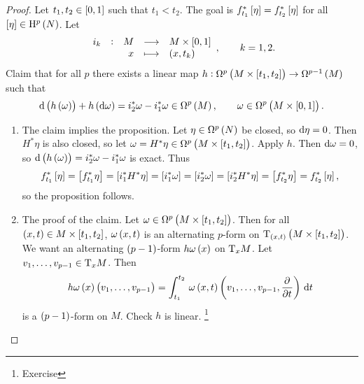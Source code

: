 \begin{proof}
Let $ t_1, t_2 \in \sbr{0, 1} $ such that $ t_1 < t_2 $. The goal is $ f_{t_1}^*\sbr{\eta} = f_{t_2}^*\sbr{\eta} $ for all $ \sbr{\eta} \in \H^p\br{N} $. Let
$$ \function[i_k]{M}{M \times \sbr{0, 1}}{x}{\br{x, t_k}}, \qquad k = 1, 2. $$
Claim that for all $ p $ there exists a linear map $ h : \Omega^p\br{M \times \sbr{t_1, t_2}} \to \Omega^{p - 1}\br{M} $ such that
$$ \d\br{h\br{\omega}} + h\br{\d\omega} = i_2^*\omega - i_1^*\omega \in \Omega^p\br{M}, \qquad \omega \in \Omega^p\br{M \times \sbr{0, 1}}. $$
\begin{enumerate}[label=Step \arabic*., leftmargin=0.5in]
\item The claim implies the proposition. Let $ \eta \in \Omega^p\br{N} $ be closed, so $ \mathrm{d}\eta = 0 $. Then $ H^*\eta $ is also closed, so let $ \omega = H^*\eta \in \Omega^p\br{M \times \sbr{t_1, t_2}} $. Apply $ h $. Then $ \mathrm{d}\omega = 0 $, so $ \d\br{h\br{\omega}} = i_2^*\omega - i_1^*\omega $ is exact. Thus
$$ f_{t_1}^*\sbr{\eta} = \sbr{f_{t_1}^*\eta} = \sbr{i_1^*H^*\eta} = \sbr{i_1^*\omega} = \sbr{i_2^*\omega} = \sbr{i_2^*H^*\eta} = \sbr{f_{t_2}^*\eta} = f_{t_2}^*\sbr{\eta}, $$
so the proposition follows.
\item The proof of the claim. Let $ \omega \in \Omega^p\br{M \times \sbr{t_1, t_2}} $. Then for all $ \br{x, t} \in M \times \sbr{t_1, t_2} $, $ \omega\br{x, t} $ is an alternating $ p $-form on $ \T_{\br{x, t}}\br{M \times \sbr{t_1, t_2}} $. We want an alternating $ \br{p - 1} $-form $ h\omega\br{x} $ on $ \mathrm{T}_xM $. Let $ v_1, \dots, v_{p - 1} \in \mathrm{T}_xM $. Then
$$ h\omega\br{x}\br{v_1, \dots, v_{p - 1}} = \intd{t_1}{t_2}{\omega\br{x, t}\br{v_1, \dots, v_{p - 1}, \dpd{}{t}}}{t} $$
is a $ \br{p - 1} $-form on $ M $. Check $ h $ is linear. \footnote{Exercise}
\end{enumerate}
\end{proof}

